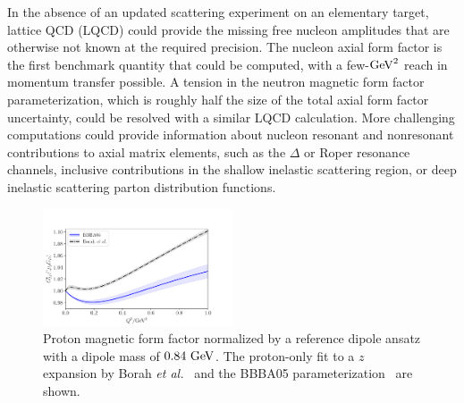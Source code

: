 In the absence of an updated scattering experiment on an elementary target,
 lattice QCD (LQCD) could provide the missing free nucleon amplitudes
 that are otherwise not known at the required precision.
The nucleon axial form factor is the first benchmark quantity that could be computed,
 with a few-${\rm GeV}^2$ reach in momentum transfer possible.
A tension in the neutron magnetic form factor parameterization,
 which is roughly half the size of the total axial form factor uncertainty,
 could be resolved with a similar LQCD calculation.
More challenging computations could provide information about nucleon
 resonant and nonresonant contributions to axial matrix elements,
 such as the $\Delta$ or Roper resonance channels,
 inclusive contributions in the shallow inelastic scattering region,
 or deep inelastic scattering parton distribution functions.

\begin{figure}[hbt!]
 \centering
 \includegraphics[width=0.5\textwidth]{plots/proton_magnetic-standalone.pdf}
\caption{
 Proton magnetic form factor normalized by a reference dipole ansatz
 with a dipole mass of $0.84~{\rm GeV}$.
 The proton-only fit to a $z$ expansion by Borah {\it et al.}~\cite{Borah:2020gte}
 and the BBBA05 parameterization~\cite{Bradford:2006yz} are shown.
 \label{fig:protonmagneticff}
}
\end{figure}

